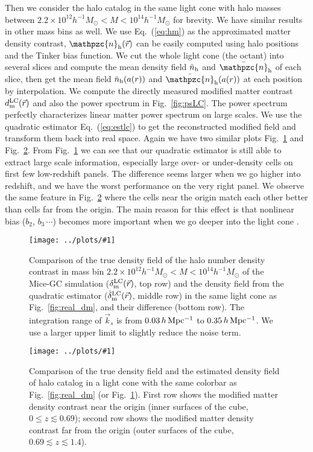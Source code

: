 \documentclass[prd,amsmath,amssymb,floatfix,superscriptaddress,nofootinbib,twocolumn]{revtex4-1}
\newcommand{\LC}{\rm LC}
\newcommand{\vrr}{\vec{r}}
\newcommand{\vk}{\vec{k}}
\newcommand{\ec}[1]{Eq.~(\ref{eq:#1})}
\newcommand{\rf}[1]{\ref{fig:#1}}
\newcommand{\sfig}[2]{
\texttt{[image: ../plots/\#1]}
        }
\newcommand{\Sfig}[2]{
   \begin{figure}[thbp]
   \begin{center}
    \sfig{../plots/#1.pdf}{\columnwidth}
    \caption{{\small #2}}
    \label{fig:#1}
     \end{center}
   \end{figure}
}
\begin{document}
Then we consider the halo catalog in the same light cone with halo masses between $2.2 \times 10^{12}h^{-1}M_{\odot}<M < 10^{14}h^{-1}M_{\odot}$ for brevity. We have similar results in other mass bins as well. We use \ec{hm} as the approximated matter density contrast, $\mathpzc{n}_{\rm h}(\vrr)$ can be easily computed using halo positions and the Tinker bias function. We cut the whole light cone (the octant) into several slices and compute the mean density field $\bar{{n}}_{\rm h}$ and $\bar{\mathpzc{n}}_{\rm h}$ of each slice, then get the mean field  $\bar{{n}}_{\rm h}(a(r))$ and $\bar{\mathpzc{n}}_{\rm h}(a(r))$ at each position by interpolation. We compute the directly measured modified matter contrast $d_{\rm m}^{\LC}(\vrr)$ and also the power spectrum in Fig.~\rf{psLC}. The power spectrum perfectly characterizes linear matter power spectrum on large scales. We use the quadratic estimator \ec{estlc} to get the reconstructed modified field and transform them back into real space. Again we have two similar plots Fig.~\rf{real_halo} and Fig.~\rf{cube_halo}. From Fig.~\rf{real_halo} we can see that our quadratic estimator is still able to extract large scale information, especially large over- or under-density cells on first few low-redshift panels. The difference seems larger when we go higher into redshift, and we have the worst performance on the very right panel. We observe the same feature in Fig.~\rf{cube_halo} where the cells near the origin match each other better than cells far from the origin. The main reason for this effect is that nonlinear bias ($b_{2}$, $b_{3}\,\cdots$) becomes more important when we go deeper into the light cone \cite{Lazeyras:2016nbs}.

\Sfig{real_halo}{Comparison of the true density field of the halo number density contrast in mass bin $2.2 \times 10^{12}h^{-1}M_{\odot}<M < 10^{14}h^{-1}M_{\odot}$ of the Mice-GC simulation ($\delta^{\rm LC}_{\rm m}(\vrr)$, top row) and the density field from the quadratic estimator ($\hat{\delta}_{\rm m}^{\rm LC}(\vrr)$, middle row) in the same light cone as Fig.~\rf{real_dm}, and their difference (bottom row). The integration range of $\vk_{s}$ is from $0.03\, h \rm \, Mpc^{-1}$ to $0.35\, h \rm \, Mpc^{-1}$. We use a larger upper limit to slightly reduce the noise term.} 
\Sfig{cube_halo}{Comparison of the true density field and the estimated density field of halo catalog in a light cone with the same colorbar as Fig.~\rf{real_dm} (or Fig.~\rf{real_halo}). First row shows the modified matter density contrast near the origin (inner surfaces of the cube, $0\leqslant z \lesssim 0.69$); second row shows the modified matter density contrast far from the origin (outer surfaces of the cube, $0.69\lesssim z \lesssim 1.4$).}
\end{document}
